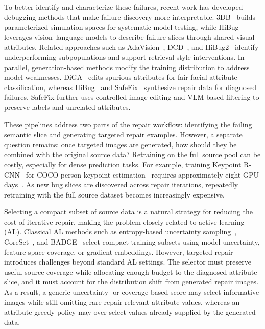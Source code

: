 \documentclass{article}
\newcommand{\safefix}{SafeFix\xspace}
\newcommand{\hibug}{HiBug\xspace}
\begin{document}
To better identify and characterize these failures, recent work has developed debugging methods that make failure discovery more interpretable. 3DB~\citep{leclerc20213db} builds parameterized simulation spaces for systematic model testing, while \hibug~\citep{chen2023hibug} leverages vision--language models to describe failure slices through shared visual attributes. Related approaches such as AdaVision~\citep{gao2023adaptive}, DCD~\citep{singla2024data}, and HiBug2~\citep{chen2025hibug2} identify underperforming subpopulations and support retrieval-style interventions. In parallel, generation-based methods modify the training distribution to address model weaknesses. DiGA~\citep{zhang2024distributionally} edits spurious attributes for fair facial-attribute classification, whereas \hibug~\citep{chen2023hibug} and \safefix~\citep{xu2025safefix} synthesize repair data for diagnosed failures. \safefix further uses controlled image editing and VLM-based filtering to preserve labels and unrelated attributes.

These pipelines address two parts of the repair workflow: identifying the failing semantic slice and generating targeted repair examples. However, a separate question remains: once targeted images are generated, how should they be combined with the original source data? Retraining on the full source pool can be costly, especially for dense prediction tasks. For example, training Keypoint R-CNN~\citep{mask-rcnn-2017} for COCO person keypoint estimation~\citep{lin2014microsoft} requires approximately eight GPU-days~\citep{detectron2modelzoo}. As new bug slices are discovered across repair iterations, repeatedly retraining with the full source dataset becomes increasingly expensive.

Selecting a compact subset of source data is a natural strategy for reducing the cost of iterative repair, making the problem closely related to active learning (AL). Classical AL methods such as entropy-based uncertainty sampling~\citep{settles2009active}, CoreSet~\citep{sener2018active}, and BADGE~\citep{ash2020deep} select compact training subsets using model uncertainty, feature-space coverage, or gradient embeddings. However, targeted repair introduces challenges beyond standard AL settings. The selector must preserve useful source coverage while allocating enough budget to the diagnosed attribute slice, and it must account for the distribution shift from generated repair images. As a result, a generic uncertainty- or coverage-based score may select informative images while still omitting rare repair-relevant attribute values, whereas an attribute-greedy policy may over-select values already supplied by the generated data.
\end{document}
